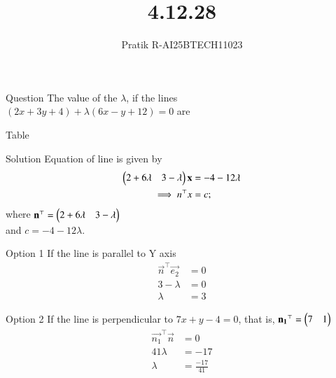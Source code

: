 \documentclass{beamer}
\title 
{4.12.28}
\author 
{Pratik R-AI25BTECH11023}
\begin{document}
\frame{\titlepage}
\begin{frame}{Question}
The value of the $\lambda$,  if the lines\\$(2x+3y+4)+\lambda(6x-y+12)=0$ are
\end{frame}

\begin{frame}{Table}
    
\end{frame}
\begin{frame}{Solution} 
Equation of line is given by
\begin{align}
    \begin{pmatrix}2+6\lambda &3-\lambda\end{pmatrix} \mathbf{x} &=-4-12\lambda\\
    \implies n^\top x &= c;
\end{align}
where $\mathbf{n}^\top = \begin{pmatrix}2+6\lambda &3-\lambda\end{pmatrix}$\\
and $c=-4-12\lambda$. \\
\end{frame}
\begin{frame}{Option 1}
If the line is parallel to Y axis
\begin{align}
\vec{n}^\top \vec{e_2} &=0 \\
3 -\lambda &= 0 \\
\lambda &= 3
\end{align}
\end{frame}

\begin{frame}{Option 2}
If the line is perpendicular to $7x+y-4=0$, that is, $\mathbf{n_1}^\top =\begin{pmatrix}7&1\end{pmatrix}$
\begin{align}
    \vec{n_1}^\top \vec{n} &= 0 \\
    41\lambda &= -17 \\
    \lambda &= \frac{-17}{41}
\end{align}
\end{frame}
\end{document}
